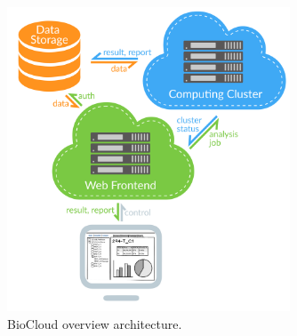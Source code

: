 \begin{figure}[!htbp]
\centering
\includegraphics[width=0.75\textwidth]{images/overview_arch}
\caption[BioCloud overview architecture]{BioCloud overview architecture.}
\label{fig:overview-arch}
\end{figure}

